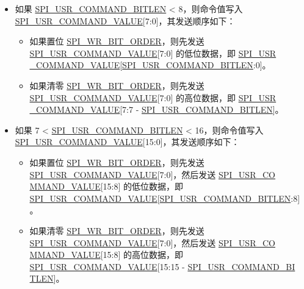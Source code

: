 \documentclass[main\_\_CN.tex]{subfiles}
\begin{document}
\begin{itemize}
\item 如果 \hyperref[fielddesc:SPIUSRCOMMANDBITLEN]{SPI\_USR\_COMMAND\_BITLEN} < 8，则命令值写入 \hyperref[fielddesc:SPIUSRCOMMANDVALUE]{SPI\_USR\_COMMAND\_VALUE}[7:0]，其发送顺序如下：
\begin{itemize}
    \item 如果置位 \hyperref[fielddesc:SPIWRBITORDER]{SPI\_WR\_BIT\_ORDER}，则先发送 \hyperref[fielddesc:SPIUSRCOMMANDVALUE]{SPI\_USR\_COMMAND\_VALUE}[7:0] 的低位数据，即 \hyperref[fielddesc:SPIUSRCOMMANDVALUE]{SPI\_USR\\\_COMMAND\_VALUE}[\hyperref[fielddesc:SPIUSRCOMMANDBITLEN]{SPI\_USR\_COMMAND\_BITLEN}:0]。
    \item 如果清零 \hyperref[fielddesc:SPIWRBITORDER]{SPI\_WR\_BIT\_ORDER}，则先发送 \hyperref[fielddesc:SPIUSRCOMMANDVALUE]{SPI\_USR\_COMMAND\_VALUE}[7:0] 的高位数据，即 \hyperref[fielddesc:SPIUSRCOMMANDVALUE]{SPI\_USR\\\_COMMAND\_VALUE}[7:7 - \hyperref[fielddesc:SPIUSRCOMMANDBITLEN]{SPI\_USR\_COMMAND\_BITLEN}]。
\end{itemize}

\item  如果 7 < \hyperref[fielddesc:SPIUSRCOMMANDBITLEN]{SPI\_USR\_COMMAND\_BITLEN} < 16，则命令值写入 \hyperref[fielddesc:SPIUSRCOMMANDVALUE]{SPI\_USR\_COMMAND\_VALUE}[15:0]，其发送顺序如下：
\begin{itemize}
    \item 如果置位 \hyperref[fielddesc:SPIWRBITORDER]{SPI\_WR\_BIT\_ORDER}，则先发送 \hyperref[fielddesc:SPIUSRCOMMANDVALUE]{SPI\_USR\_COMMAND\_VALUE}[7:0]，然后发送 \hyperref[fielddesc:SPIUSRCOMMANDVALUE]{SPI\_USR\_CO\\MMAND\_VALUE}[15:8] 的低位数据，即 \hyperref[fielddesc:SPIUSRCOMMANDVALUE]{SPI\_USR\_COMMAND\_VALUE}[\hyperref[fielddesc:SPIUSRCOMMANDBITLEN]{SPI\_USR\_COMMAND\_BITLEN}:8]。
    \item 如果清零 \hyperref[fielddesc:SPIWRBITORDER]{SPI\_WR\_BIT\_ORDER}，则先发送 \hyperref[fielddesc:SPIUSRCOMMANDVALUE]{SPI\_USR\_COMMAND\_VALUE}[7:0]，然后发送 \hyperref[fielddesc:SPIUSRCOMMANDVALUE]{SPI\_USR\_CO\\MMAND\_VALUE}[15:8] 的高位数据，即 \hyperref[fielddesc:SPIUSRCOMMANDVALUE]{SPI\_USR\_COMMAND\_VALUE}[15:15 - \hyperref[fielddesc:SPIUSRCOMMANDBITLEN]{SPI\_USR\_COMMAND\_BI\\TLEN}]。
\end{itemize}
\end{itemize}
\end{document}
